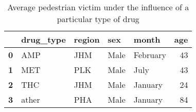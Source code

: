 \begin{table}
\caption{Average pedestrian victim under the influence of a particular type of drug}
\begin{tabular}{lllllr}
\toprule
 & drug_type & region & sex & month & age \\
\midrule
\textbf{0} & AMP & JHM & Male & February & 43 \\
\textbf{1} & MET & PLK & Male & July & 43 \\
\textbf{2} & THC & JHM & Male & January & 24 \\
\textbf{3} & ather & PHA & Male & January & 84 \\
\bottomrule
\end{tabular}
\end{table}
